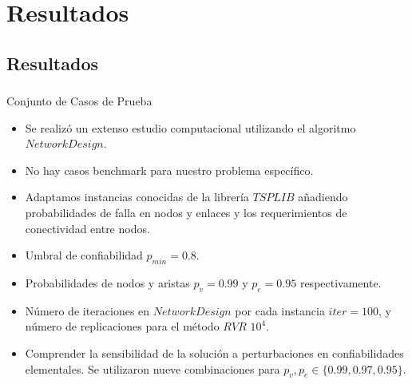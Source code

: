 \section{Resultados}
\subsection{Resultados}
\begin{frame}\frametitle{}
\begin{block}{Conjunto de Casos de Prueba}
\begin{small}
\begin{itemize}
 \item Se realizó un extenso estudio computacional utilizando el algoritmo $NetworkDesign$.
 \item No hay casos benchmark para nuestro problema específico.
 \item Adaptamos instancias conocidas de la librería $TSPLIB$ añadiendo probabilidades de falla en nodos y enlaces y los requerimientos de conectividad entre nodos.
 \item Umbral de confiabilidad $p_{min}=0.8$.
 \item Probabilidades de nodos y aristas $p_v=0.99$ y $p_e=0.95$ respectivamente.
 \item Número de iteraciones en $NetworkDesign$ por cada instancia $iter=100$, y número de replicaciones para el método $RVR$ $10^4$.
 \item Comprender la sensibilidad de la solución a perturbaciones en confiabilidades elementales. Se utilizaron nueve combinaciones para $p_{v},p_{e} \in \{0.99, 0.97,0.95\}$.
\end{itemize} 
\end{small}
\end{block}
\end{frame}

